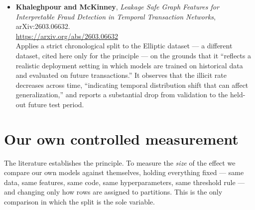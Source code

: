 \documentclass[11pt,a4paper]{article}
\begin{document}
\begin{itemize}[itemsep=4pt]
      \item \textbf{Khaleghpour and McKinney}, \emph{Leakage Safe Graph Features for
            Interpretable Fraud Detection in Temporal Transaction Networks}, arXiv:2603.06632. \\
            \small\url{https://arxiv.org/abs/2603.06632}\\
            \normalsize Applies a strict chronological split to the Elliptic dataset --- a
            different dataset, cited here only for the principle --- on the grounds that it
            ``reflects a realistic deployment setting in which models are trained on historical
            data and evaluated on future transactions.'' It observes that the illicit rate
            decreases across time, ``indicating temporal distribution shift that can affect
            generalization,'' and reports a substantial drop from validation to the held-out
            future test period.
\end{itemize}

\section{Our own controlled measurement}\label{sec:evidence}
The literature establishes the principle. To measure the \emph{size} of the effect we compare
our own models against themselves, holding everything fixed --- same data, same features, same
code, same hyperparameters, same threshold rule --- and changing only how rows are assigned to
partitions. This is the only comparison in which the split is the sole variable.
\end{document}
